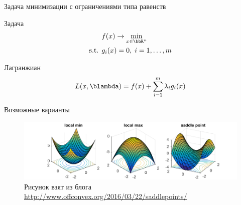\documentclass[12pt]{beamer}
\begin{document}
\begin{frame}{{\small Задача минимизации с ограничениями типа равенств}}

\begin{block}{Задача}
\vspace{-3mm}
\begin{equation*}
\begin{split}
& f(x) \rightarrow \min\limits_{x \in \bbR^n} \\
\text{s.t. } & g_i(x) = 0, \; i = 1,\ldots, m 
\end{split}
\end{equation*}
\end{block}

\begin{block}{Лагранжиан}
\vspace{-2mm}
\begin{equation*}
L(x, \blambda) = f(x) + \sum\limits_{i=1}^m\lambda_i g_i(x)
\end{equation*}
\end{block}


\end{frame}

\begin{frame}{Возможные варианты}
\begin{figure}
\centering
\includegraphics[scale=0.5]{minmaxsaddle.png}
\caption{Рисунок взят из блога \url{http://www.offconvex.org/2016/03/22/saddlepoints/}}
\end{figure}
\end{frame}
\end{document}
